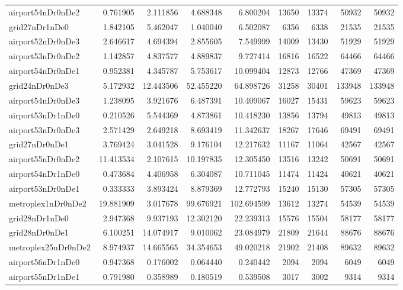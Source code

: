 \begin{longtable}{|l|r|r|r|r|r|r|r|r|}
airport54nDr0nDe2 & 0.761905 & 2.111856 & 4.688348 & 6.800204 & 13650 & 13374 & 50932 & 50932 \\
grid27nDr1nDe0 & 1.842105 & 5.462047 & 1.040040 & 6.502087 & 6356 & 6338 & 21535 & 21535 \\
airport52nDr0nDe3 & 2.646617 & 4.694394 & 2.855605 & 7.549999 & 14009 & 13430 & 51929 & 51929 \\
airport53nDr0nDe2 & 1.142857 & 4.837577 & 4.889837 & 9.727414 & 16816 & 16522 & 64466 & 64466 \\
airport54nDr0nDe1 & 0.952381 & 4.345787 & 5.753617 & 10.099404 & 12873 & 12766 & 47369 & 47369 \\
grid24nDr0nDe3 & 5.172932 & 12.443506 & 52.455220 & 64.898726 & 31258 & 30401 & 133948 & 133948 \\
airport54nDr0nDe3 & 1.238095 & 3.921676 & 6.487391 & 10.409067 & 16027 & 15431 & 59623 & 59623 \\
airport53nDr1nDe0 & 0.210526 & 5.544369 & 4.873861 & 10.418230 & 13856 & 13794 & 49813 & 49813 \\
airport53nDr0nDe3 & 2.571429 & 2.649218 & 8.693419 & 11.342637 & 18267 & 17646 & 69491 & 69491 \\
grid27nDr0nDe1 & 3.769424 & 3.041528 & 9.176104 & 12.217632 & 11167 & 11064 & 42567 & 42567 \\
airport55nDr0nDe2 & 11.413534 & 2.107615 & 10.197835 & 12.305450 & 13516 & 13242 & 50691 & 50691 \\
airport54nDr1nDe0 & 0.473684 & 4.406958 & 6.304087 & 10.711045 & 11474 & 11424 & 40621 & 40621 \\
airport53nDr0nDe1 & 0.333333 & 3.893424 & 8.879369 & 12.772793 & 15240 & 15130 & 57305 & 57305 \\
metroplex1nDr0nDe2 & 19.881909 & 3.017678 & 99.676921 & 102.694599 & 13612 & 13274 & 54539 & 54539 \\
grid28nDr1nDe0 & 2.947368 & 9.937193 & 12.302120 & 22.239313 & 15576 & 15504 & 58177 & 58177 \\
grid28nDr0nDe1 & 6.100251 & 14.074917 & 9.010062 & 23.084979 & 21809 & 21644 & 88676 & 88676 \\
metroplex25nDr0nDe2 & 8.974937 & 14.665565 & 34.354653 & 49.020218 & 21902 & 21408 & 89632 & 89632 \\
airport56nDr1nDe0 & 0.947368 & 0.176002 & 0.064440 & 0.240442 & 2094 & 2094 & 6049 & 6049 \\
airport55nDr1nDe1 & 0.791980 & 0.358989 & 0.180519 & 0.539508 & 3017 & 3002 & 9314 & 9314 \\

\end{longtable}
